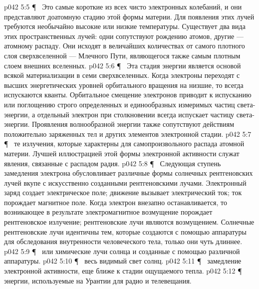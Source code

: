 \vs p042 5:5 \P\ \bibnobreakspace {} Это самые короткие из всех чисто электронных колебаний, и они представляют доатомную стадию этой формы материи. Для появления этих лучей требуются необычайно высокие или низкие температуры. Существует два вида этих пространственных лучей: одни сопутствуют рождению атомов, другие --- атомному распаду. Они исходят в величайших количествах от самого плотного слоя сверхвселенной --- Млечного Пути, являющегося также самым плотным слоем внешних вселенных.
\vs p042 5:6 \P\ \bibnobreakspace {} Эта стадия энергии является основой всякой материализации в семи сверхвселенных. Когда электроны переходят с высших энергетических уровней орбитального вращения на низшие, то всегда испускаются кванты. Орбитальное смещение электронов приводит к испусканию или поглощению строго определенных и единообразных измеримых частиц света\hyp{}энергии, а отдельный электрон при столкновении всегда испускает частицу света\hyp{}энергии. Проявления волнообразной энергии также сопутствуют действиям положительно заряженных тел и других элементов электронной стадии.
\vs p042 5:7 \P\ \bibnobreakspace {} те излучения, которые характерны для самопроизвольного распада атомной материи. Лучшей иллюстрацией этой формы электронной активности служат явления, связанные с распадом радия.
\vs p042 5:8 \P\ \bibnobreakspace {} Следующая ступень замедления электрона обусловливает различные формы солнечных рентгеновских лучей вкупе с искусственно созданными рентгеновскими лучами. Электронный заряд создает электрическое поле; движение вызывает электрический ток; ток порождает магнитное поле. Когда электрон внезапно останавливается, то возникающее в результате электромагнитное возмущение порождает рентгеновское излучение; рентгеновские лучи являются  возмущением. Солнечные рентгеновские лучи идентичны тем, которые создаются с помощью аппаратуры для обследования внутренности человеческого тела, только они чуть длиннее.
\vs p042 5:9 \P\ \bibnobreakspace {} или химические лучи солнца и созданные с помощью различной аппаратуры.
\vs p042 5:10 \P\ \bibnobreakspace {} весь видимый свет солнц.
\vs p042 5:11 \P\ \bibnobreakspace {} замедление электронной активности, еще ближе к стадии ощущаемого тепла.
\vs p042 5:12 \P\ \bibnobreakspace {} энергии, используемые на Урантии для радио и телевещания.
